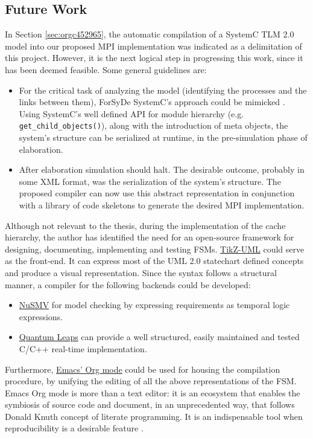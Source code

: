 \documentclass[11pt]{article}
\begin{document}
\subsection{Future Work}
\label{sec:orgec04b18}
In Section \ref{sec:orgc452965}, the automatic compilation of a SystemC TLM 2.0 model into our proposed MPI implementation was indicated as a delimitation of this project.
However, it is the next logical step in progressing this work, since it has been deemed feasible.
Some general guidelines are:
\begin{itemize}
\item For the critical task of analyzing the model (identifying the processes and the links between them),  ForSyDe SystemC's approach could be mimicked \cite{Hosein2012}.
Using SystemC's well defined API for module hierarchy (e.g. \texttt{get\_child\_objects()}), along with the introduction of meta objects, the system's structure can be
serialized at runtime, in the pre-simulation phase of elaboration.
\item After elaboration simulation should halt. The desirable outcome, probably in some XML format, was the serialization of the system's structure. 
The proposed compiler can now use this abstract representation in conjunction with a library of code skeletons to generate the desired MPI implementation.
\end{itemize}

Although not relevant to the thesis, during the implementation of the cache hierarchy, the author has identified the need for an open-source framework for designing, documenting, implementing and testing FSMs.
\href{http://perso.ensta-paristech.fr/\~kielbasi/tikzuml/}{TikZ-UML} could serve as the front-end. 
It can express most of the UML 2.0 statechart defined concepts and produce a visual representation.
Since the syntax follows a structural manner, a compiler for the following backends could be developed:
\begin{itemize}
\item \href{http://nusmv.fbk.eu/}{NuSMV} for model checking by expressing requirements as temporal logic expressions.
\item \href{http://www.state-machine.com/}{Quantum Leaps} can provide a well structured, easily maintained and tested C/C++ real-time implementation.
\end{itemize}
Furthermore, \href{http://orgmode.org/}{Emacs' Org mode} could be used for housing the compilation procedure, by unifying the editing of all the above representations of the FSM.
Emacs Org mode is more than a text editor: it is an ecosystem that enables the symbiosis of source code and document, in an unprecedented way, that follows Donald Knuth concept of literate programming.
It is an indispensable tool when reproducibility is a desirable feature \cite{Schulte2011}.
\end{document}
